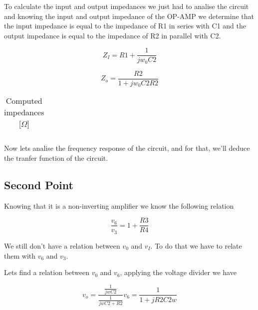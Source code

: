 \par To calculate the input and output impedances we just had to analise the circuit and knowing the input and output impedance of the OP-AMP we determine that the input impedance is equal to the impedance of R1 in series with C1 and the output impedance is equal to the impedance of R2 in parallel with C2.

\begin{equation}
	Z_I = R1 + \frac{1}{j w_0 C2}
\end{equation}

\begin{equation}
	Z_o = \frac{R2}{1 + j w_0 C2 R2}
\end{equation}

\begin{table}[H]
	\centering
	\begin{tabularx}{0.9\textwidth} {
 	    | >{\raggedright\arraybackslash}X
  	    | >{\raggedleft\arraybackslash}X | }
	\hline
	
	\end{tabularx}
	\caption{Computed impedances [$\Omega$]}
	\label{tab:currents}
\end{table}
\vspace{5mm}

\par Now lets analise the frequency response of the circuit, and for that, we'll deduce the tranfer function of the circuit.
 
\subsection{Second Point}

\par Knowing that it is a non-inverting amplifier we know the following relation

\begin{equation}
	\frac{v_6}{v_3} = 1 + \frac{R3}{R4}
\end{equation}

\par We still don't have a relation between $v_0$ and $v_I$. To do that we have to relate them with $v_6$ and $v_3$. 
\par Lets find a relation between $v_0$ and $v_6$, applying the voltage divider we have

\begin{equation}
	v_o = \frac{\frac{1}{jwC2}}{\frac{1}{jwC2 + R2}}v_6 = \frac{1}{1 + jR2C2w}
\end{equation}

